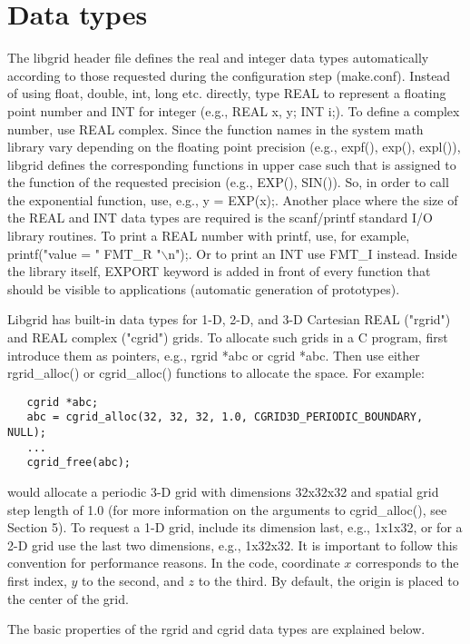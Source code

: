 \documentclass[12pt,letterpaper]{report}
\begin{document}
\section{Data types}

The libgrid header file defines the real and integer data types automatically according to those requested during the configuration step (make.conf). Instead of using float, double, int, long etc. directly, type REAL to represent a floating point number and INT for integer (e.g., REAL x, y; INT i;). To define a complex number, use REAL complex. Since the function names in the system math library vary depending on the floating point precision (e.g., expf(), exp(), expl()), libgrid defines the corresponding functions in upper case such that is assigned to the function of the requested precision (e.g., EXP(), SIN()). So, in order to call the exponential function, use, e.g., y = EXP(x);. Another place where the size of the REAL and INT data types are required is the scanf/printf standard I/O library routines. To print a REAL number with printf, use, for example, printf("value = " FMT\_R "$\backslash$n");. Or to print an INT use FMT\_I instead. Inside the library itself, EXPORT keyword is added in front of every function that should be visible to applications (automatic generation of prototypes).

Libgrid has built-in data types for 1-D, 2-D, and 3-D Cartesian REAL ("rgrid") and REAL complex ("cgrid") grids. To allocate such grids in a C program, first introduce them as pointers, e.g., rgrid *abc or cgrid *abc. Then use either rgrid\_alloc() or cgrid\_alloc() functions to allocate the space. For example:
\begin{verbatim}
   cgrid *abc;
   abc = cgrid_alloc(32, 32, 32, 1.0, CGRID3D_PERIODIC_BOUNDARY, NULL);
   ...
   cgrid_free(abc);
\end{verbatim}
would allocate a periodic 3-D grid with dimensions 32x32x32 and spatial grid step length of 1.0 (for more information on the arguments to cgrid\_alloc(), see Section 5). To request a 1-D grid, include its dimension last, e.g., 1x1x32, or for a 2-D grid use the last two dimensions, e.g., 1x32x32. It is important to follow this convention for performance reasons. In the code, coordinate $x$ corresponds to the first index, $y$ to the second, and $z$ to the third. By default, the origin is placed to the center of the grid.

The basic properties of the rgrid and cgrid data types are explained below.
\end{document}
